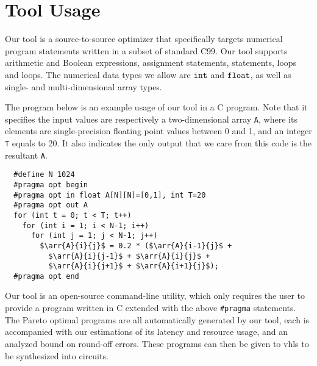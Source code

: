 \section{Tool Usage}
\label{lo:sec:usage}


Our tool is a source-to-source optimizer that specifically targets numerical
program statements written in a subset of standard C99.  Our tool
supports arithmetic and Boolean expressions, assignment statements, \iflit{}
statements, \whilelit{} loops and \forlit{} loops.  The numerical data types we
allow are $\texttt{int}$ and $\texttt{float}$, as well as single- and multi-dimensional
array types.

The program below is an example usage of our tool in a C program.  Note
that it specifies the input values are respectively a two-dimensional array
\verb|A|, where its elements are single-precision floating point values between
0 and 1, and an integer \verb|T| equals to 20.  It also indicates the only
output that we care from this code is the resultant \verb|A|.
\begin{lstlisting}
  #define N 1024
  #pragma opt begin
  #pragma opt in float A[N][N]=[0,1], int T=20
  #pragma opt out A
  for (int t = 0; t < T; t++)
    for (int i = 1; i < N-1; i++)
      for (int j = 1; j < N-1; j++)
        $\arr{A}{i}{j}$ = 0.2 * ($\arr{A}{i-1}{j}$ +
          $\arr{A}{i}{j-1}$ + $\arr{A}{i}{j}$ +
          $\arr{A}{i}{j+1}$ + $\arr{A}{i+1}{j}$);
  #pragma opt end
\end{lstlisting}

Our tool is an open-source command-line utility, which only requires the user
to provide a program written in C extended with the above \verb|#pragma|
statements.  The Pareto optimal programs are all automatically generated by
our tool, each is accompanied with our estimations of its latency and resource
usage, and an analyzed bound on round-off errors.  These programs can then be
given to \gls{vhls} to be synthesized into circuits.

